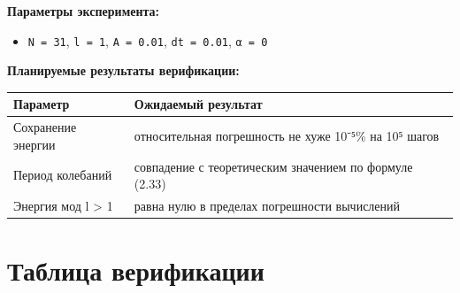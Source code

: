 \documentclass[
  12pt,
  a4paper,
  DIV=11,
  numbers=noendperiod]{scrreprt}
\providecommand{\tightlist}{%
  \setlength{\itemsep}{0pt}\setlength{\parskip}{0pt}}\usepackage{longtable,booktabs,array}
\begin{document}
\textbf{Параметры эксперимента:}

\begin{itemize}
\tightlist
\item
  \texttt{N\ =\ 31}, \texttt{l\ =\ 1}, \texttt{A\ =\ 0.01},
  \texttt{dt\ =\ 0.01}, \texttt{α\ =\ 0}
\end{itemize}

\textbf{Планируемые результаты верификации:}

\begin{longtable}[]{@{}
  >{\raggedright\arraybackslash}p{}
  >{\raggedright\arraybackslash}p{}@{}}
\toprule\noalign{}
\begin{minipage}[b]{\linewidth}\raggedright
Параметр
\end{minipage} & \begin{minipage}[b]{\linewidth}\raggedright
Ожидаемый результат
\end{minipage} \\
\midrule\noalign{}
\endhead
\bottomrule\noalign{}
\endlastfoot
Сохранение энергии & относительная погрешность не хуже 10⁻⁵\% на 10⁵
шагов \\
Период колебаний & совпадение с теоретическим значением по формуле
(2.33) \\
Энергия мод l \textgreater{} 1 & равна нулю в пределах погрешности
вычислений \\
\end{longtable}

\section{Таблица
верификации}\label{ux442ux430ux431ux43bux438ux446ux430-ux432ux435ux440ux438ux444ux438ux43aux430ux446ux438ux438}
\end{document}
